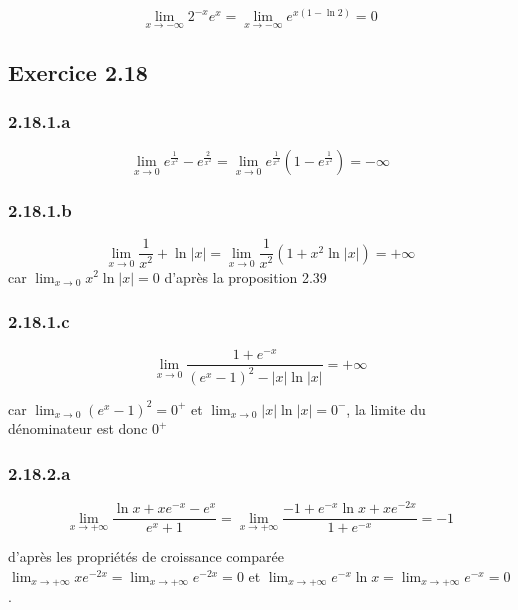 \documentclass{report}
\begin{document}
\begin{displaymath}
	\lim_{x \rightarrow -\infty} 2^{-x}e^x = \lim_{x \rightarrow -\infty} e^{x(1-\ln 2)} = 0^{}
\end{displaymath}


\subsection*{Exercice 2.18}

\subsubsection*{2.18.1.a}
\begin{displaymath}
	\lim_{x \rightarrow 0} e^{\frac{1}{x^2}} - e^{\frac{2}{x^2}}  = \lim_{x \rightarrow 0} e^{\frac{1}{x^2}}(1 - e^{\frac{1}{x^2}}) = -\infty
\end{displaymath}

\subsubsection*{2.18.1.b}
\begin{displaymath}
	\lim_{x \rightarrow 0} \frac{1}{x^2}  + \ln |x| = \lim_{x \rightarrow 0} \frac{1}{x^2}  (1+ x^2\ln |x|) = +\infty
\end{displaymath}
car $ \lim_{x \rightarrow 0} x^2\ln |x| = 0$ d'après la proposition 2.39

\subsubsection*{2.18.1.c}
\begin{displaymath}
	\lim_{x \rightarrow 0} \frac{1+e^{-x}}{(e^x-1)^2 - |x|\ln |x|} = + \infty
\end{displaymath}

car $ \lim_{x \rightarrow 0} (e^x-1)^2 = 0^{+}$ et $ \lim_{x \rightarrow 0} |x|\ln |x| = 0^{-}$, la limite du dénominateur est donc $0^{+}$

\subsubsection*{2.18.2.a}
\begin{displaymath}
	\lim_{x \rightarrow +\infty} \frac{\ln x + xe^{-x}-e^x}{e^x+1} = \lim_{x \rightarrow +\infty} \frac{-1 + e^{-x}\ln x + xe^{-2x}}{1 +e^{-x}} = -1
\end{displaymath}

d'après les propriétés de croissance comparée $\lim_{x \rightarrow +\infty} xe^{-2x} = \lim_{x \rightarrow +\infty} e^{-2x} = 0$ et 
$\lim_{x \rightarrow +\infty} e^{-x}\ln x = \lim_{x \rightarrow +\infty} e^{-x} =0 $.
\end{document}
